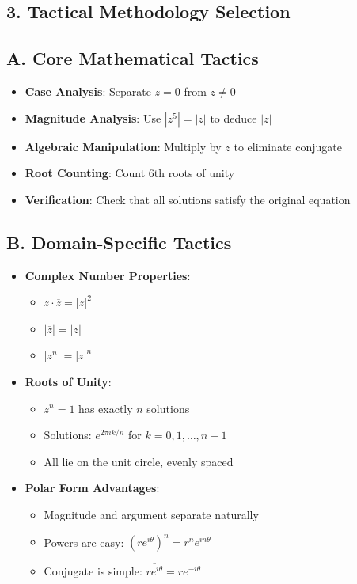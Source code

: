\documentclass[11pt]{article}
\begin{document}
\begin{tacticalbox}
\section*{3. Tactical Methodology Selection}

\subsection*{A. Core Mathematical Tactics}
\begin{itemize}[leftmargin=*]
    \item \textbf{Case Analysis}: Separate $z = 0$ from $z \neq 0$
    \item \textbf{Magnitude Analysis}: Use $|z^5| = |\overline{z}|$ to deduce $|z|$
    \item \textbf{Algebraic Manipulation}: Multiply by $z$ to eliminate conjugate
    \item \textbf{Root Counting}: Count 6th roots of unity
    \item \textbf{Verification}: Check that all solutions satisfy the original equation
\end{itemize}

\subsection*{B. Domain-Specific Tactics}
\begin{itemize}[leftmargin=*]
    \item \textbf{Complex Number Properties}:
    \begin{itemize}
        \item $z \cdot \overline{z} = |z|^2$
        \item $|\overline{z}| = |z|$
        \item $|z^n| = |z|^n$
    \end{itemize}
    \item \textbf{Roots of Unity}:
    \begin{itemize}
        \item $z^n = 1$ has exactly $n$ solutions
        \item Solutions: $e^{2\pi i k/n}$ for $k = 0, 1, \ldots, n-1$
        \item All lie on the unit circle, evenly spaced
    \end{itemize}
    \item \textbf{Polar Form Advantages}:
    \begin{itemize}
        \item Magnitude and argument separate naturally
        \item Powers are easy: $(re^{i\theta})^n = r^n e^{in\theta}$
        \item Conjugate is simple: $\overline{re^{i\theta}} = re^{-i\theta}$
    \end{itemize}
\end{itemize}


\end{tacticalbox}
\end{document}
